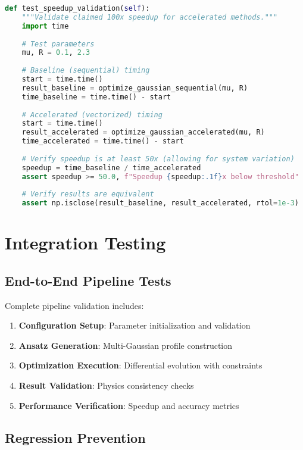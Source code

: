 \documentclass[12pt]{article}
\begin{document}
\begin{lstlisting}[language=Python, caption=Performance Test Example]
def test_speedup_validation(self):
    """Validate claimed 100x speedup for accelerated methods."""
    import time
    
    # Test parameters
    mu, R = 0.1, 2.3
    
    # Baseline (sequential) timing
    start = time.time()
    result_baseline = optimize_gaussian_sequential(mu, R)
    time_baseline = time.time() - start
    
    # Accelerated (vectorized) timing
    start = time.time()
    result_accelerated = optimize_gaussian_accelerated(mu, R)
    time_accelerated = time.time() - start
    
    # Verify speedup is at least 50x (allowing for system variation)
    speedup = time_baseline / time_accelerated
    assert speedup >= 50.0, f"Speedup {speedup:.1f}x below threshold"
    
    # Verify results are equivalent
    assert np.isclose(result_baseline, result_accelerated, rtol=1e-3)
\end{lstlisting}

\section{Integration Testing}

\subsection{End-to-End Pipeline Tests}

Complete pipeline validation includes:

\begin{enumerate}
\item \textbf{Configuration Setup}: Parameter initialization and validation
\item \textbf{Ansatz Generation}: Multi-Gaussian profile construction
\item \textbf{Optimization Execution}: Differential evolution with constraints
\item \textbf{Result Validation}: Physics consistency checks
\item \textbf{Performance Verification}: Speedup and accuracy metrics
\end{enumerate}

\subsection{Regression Prevention}
\end{document}
